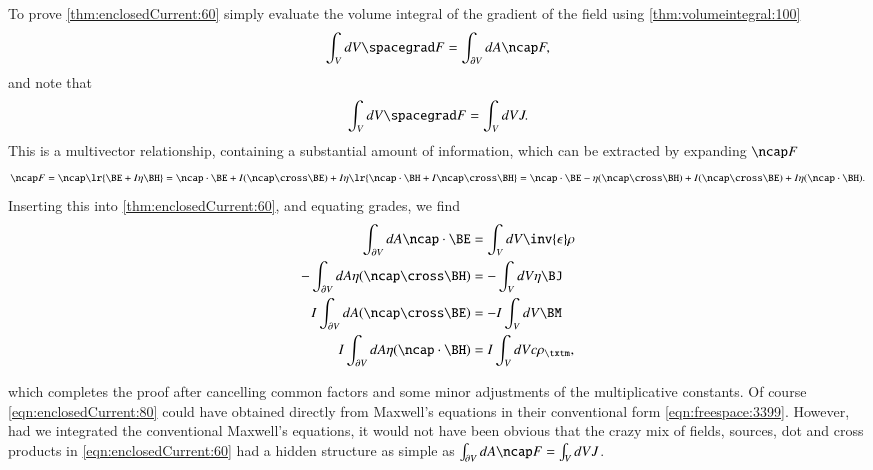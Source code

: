 To prove \cref{thm:enclosedCurrent:60}
simply evaluate the volume integral of the gradient of the field using \cref{thm:volumeintegral:100}
\begin{equation}\label{eqn:enclosedCurrent:20}
\int_V dV \spacegrad F = \int_{\partial V} dA \ncap F,
\end{equation}
and note that
\begin{dmath}\label{eqn:enclosedCurrent:60}
\int_V dV \spacegrad F = \int_V dV J.
\end{dmath}
This is a multivector relationship, containing a substantial amount of information, which can be
extracted by
expanding \( \ncap F \)
\begin{dmath}\label{eqn:enclosedCurrent:40}
\ncap F
=
\ncap \lr{ \BE + I \eta \BH }
=
\ncap \cdot \BE + I (\ncap \cross \BE) + I \eta \lr{ \ncap \cdot \BH + I \ncap \cross \BH }
=
\ncap \cdot \BE - \eta ( \ncap \cross \BH ) + I (\ncap \cross \BE) + I \eta (\ncap \cdot \BH).
\end{dmath}
Inserting this into
\cref{thm:enclosedCurrent:60}, and equating grades, we find
\begin{dmath}\label{eqn:enclosedCurrent:80}
\begin{aligned}
\int_{\partial V} dA \ncap \cdot \BE &= \int_V dV \inv{\epsilon}\rho \\
- \int_{\partial V} dA \eta ( \ncap \cross \BH ) &= - \int_V dV \eta \BJ \\
 I \int_{\partial V} dA (\ncap \cross \BE) &= - I \int_V dV \BM \\
 I \int_{\partial V} dA \eta (\ncap \cdot \BH) &=  I \int_V dV c \rho_\txtm,
\end{aligned}
\end{dmath}

which completes the proof after cancelling common factors and some minor adjustments of the multiplicative constants.
Of course \cref{eqn:enclosedCurrent:80}
could have obtained directly from Maxwell's equations in their conventional form \cref{eqn:freespace:3399}.
However, had we integrated the conventional Maxwell's equations, it would not have been obvious that the crazy mix of
fields, sources, dot and cross products in \cref{eqn:enclosedCurrent:60} had a hidden structure as simple as
\( \int_{\partial V} dA \ncap F = \int_V dV J \).
